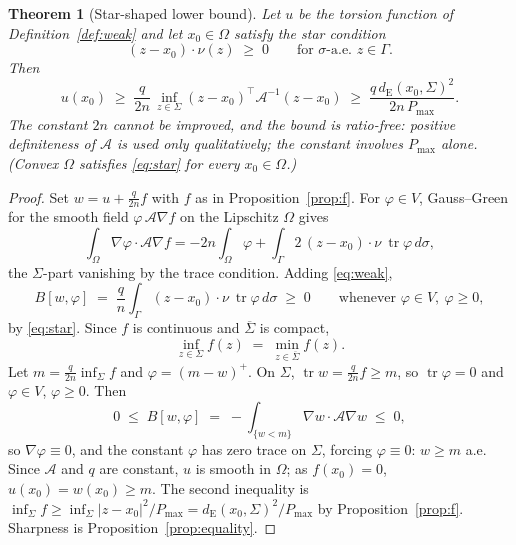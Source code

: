 \documentclass[10pt]{article}
\newtheorem{theorem}{Theorem}[section]
\theoremstyle{remark}
\newcommand{\A}{\mathcal{A}}
\newcommand{\Om}{\Omega}
\newcommand{\Sig}{\Sigma}
\newcommand{\Gam}{\Gamma}
\newcommand{\Pmax}{P_{\max}}
\newcommand{\dE}{d_{\mathrm{E}}}
\begin{document}
\begin{theorem}[Star-shaped lower bound]\label{thm:B}
Let $u$ be the torsion function of Definition~\ref{def:weak} and let
$x_0\in\Om$ satisfy the star condition
\begin{equation}\label{eq:star}
(z-x_0)\cdot\nu(z)\;\ge\;0\qquad\text{for $\sigma$-a.e. }z\in\Gam .
\end{equation}
Then
\[
u(x_0)\;\ge\;\frac{q}{2n}\,\inf_{z\in\Sig}
(z-x_0)^{\!\top}\A^{-1}(z-x_0)
\;\ge\;\frac{q\,\dE(x_0,\Sig)^2}{2n\,\Pmax}.
\]
The constant $2n$ cannot be improved, and the bound is ratio-free: positive
definiteness of $\A$ is used only qualitatively; the constant involves $\Pmax$
alone. (Convex $\Om$ satisfies \eqref{eq:star} for every $x_0\in\Om$.)
\end{theorem}

\begin{proof}
Set $w=u+\tfrac{q}{2n}f$ with $f$ as in Proposition~\ref{prop:f}. For
$\varphi\in V$, Gauss--Green for the smooth field $\varphi\,\A\nabla f$ on the
Lipschitz $\Om$ gives
\[
\int_\Om\nabla\varphi\cdot\A\nabla f
=-2n\int_\Om\varphi
+\int_{\Gam}2\,(z-x_0)\cdot\nu\ \operatorname{tr}\varphi\,d\sigma ,
\]
the $\Sig$-part vanishing by the trace condition. Adding \eqref{eq:weak},
\[
B[w,\varphi]\;=\;\frac{q}{n}\int_\Gam (z-x_0)\cdot\nu\ \operatorname{tr}
\varphi\,d\sigma\;\ge\;0
\qquad\text{whenever }\varphi\in V,\ \varphi\ge0,
\]
by \eqref{eq:star}. Since $f$ is continuous and $\overline\Sig$ is compact,
\[
\inf_{z\in\Sig}f(z)\;=\;\min_{z\in\overline\Sig}f(z).
\]
Let $m=\tfrac{q}{2n}\inf_{\Sig}f$ and
$\varphi=(m-w)^+$. On $\Sig$, $\operatorname{tr}w=\tfrac{q}{2n}f\ge m$, so
$\operatorname{tr}\varphi=0$ and $\varphi\in V$, $\varphi\ge0$. Then
\[
0\;\le\;B[w,\varphi]\;=\;-\int_{\{w<m\}}\nabla w\cdot\A\nabla w\;\le\;0,
\]
so $\nabla\varphi\equiv0$, and the constant $\varphi$ has zero trace on
$\Sig$, forcing $\varphi\equiv0$: $w\ge m$ a.e. Since $\A$ and $q$ are
constant, $u$ is smooth in $\Om$; as $f(x_0)=0$,
$u(x_0)=w(x_0)\ge m$. The second inequality is
$\inf_{\Sig}f\ge\inf_{\Sig}|z-x_0|^2/\Pmax
=\dE(x_0,\Sig)^2/\Pmax$ by Proposition~\ref{prop:f}. Sharpness is
Proposition~\ref{prop:equality}.
\end{proof}
\end{document}
